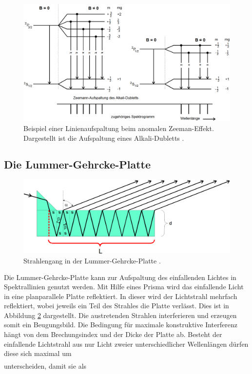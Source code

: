 \begin{figure}
	\centering
	\includegraphics[width=\linewidth-50pt,height=\textheight-50pt,keepaspectratio]{content/Images/anomaleAufspaltung.png}
    \caption{Beispiel einer Linienaufspaltung beim anomalen Zeeman-Effekt. Dargestellt ist die Aufspaltung eines Alkali-Du­bletts \cite{V27}.}
    \label{fig:anomaleAufspaltung}
\end{figure}

\subsection{Die Lummer-Gehrcke-Platte}
\begin{figure}
	\centering
	\includegraphics[width=\linewidth-50pt,height=\textheight-50pt,keepaspectratio]{content/Images/lummerPlatte.png}
    \caption{Strahlengang in der Lummer-Gehrcke-Platte \cite{V27}.}
    \label{fig:lummerPlatte}
\end{figure}
Die Lummer-Gehrcke-Platte kann zur Aufspaltung des einfallenden Lichtes in Spektrallinien genutzt werden. Mit Hilfe eines Prisma wird das einfallende Licht in eine planparallele Platte reflektiert. In dieser wird der Lichtstrahl mehrfach reflektiert, wobei jeweils ein Teil des Strahles die Platte verlässt. Dies ist in Abbildung \ref{fig:lummerPlatte} dargestellt. Die austretenden Strahlen interferieren und erzeugen somit ein Beugungsbild. Die Bedingung für maximale konstruktive Interferenz hängt von dem Brechungsindex und der Dicke der Platte ab. Besteht der einfallende Lichtstrahl aus nur Licht zweier unterschiedlicher Wellenlängen dürfen diese sich maximal um
\begin{gather*}

\end{gather*}
unterscheiden, damit sie als